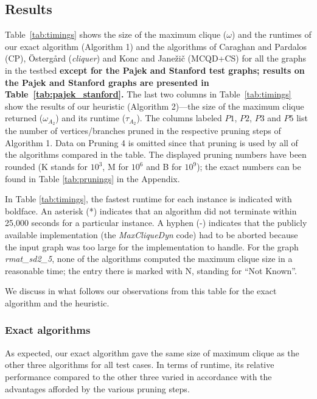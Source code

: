 \subsection{Results}
\label{sec:exp-results}




Table~\ref{tab:timings} shows the size of the maximum clique ($\omega$) and the runtimes  of our exact algorithm (Algorithm 1) and the algorithms of Caraghan and Pardalos (CP), 
\"{O}sterg{\aa}rd ({\it cliquer}) 
and Konc and Jane\v{z}i\v{c}  (MCQD+CS) for all the graphs in the testbed {\bf except  for 
the Pajek and Stanford test graphs;
results on the Pajek and Stanford graphs are presented in Table~\ref{tab:pajek_stanford}. }
The last two columns in Table~\ref{tab:timings} show the results of our 
heuristic (Algorithm 2)---the size of the maximum clique 
returned ($\omega_{A_2}$)  and its runtime ($\tau_{A_2}$). 
The columns labeled $P1$, $P2$, $P3$ and $P5$ list the number of 
vertices/branches pruned in the respective pruning steps of Algorithm 1.
Data on Pruning 4 is omitted since that pruning is used by all of the algorithms compared in the table. The displayed pruning numbers have been rounded  (K stands for $10^3$, M for $10^6$ and B for $10^9$);
the exact numbers can be found in Table \ref{tab:prunings} in the Appendix.

In Table \ref{tab:timings}, the fastest runtime for each instance is indicated with boldface. 
An asterisk (*) indicates that an algorithm did not terminate within 25,000 seconds for a particular
instance. A hyphen (-) indicates that the publicly available implementation 
(the {\it MaxCliqueDyn} code) had to be aborted because the input graph was too large 
for the implementation to handle.
For the graph {\it rmat\_sd2\_5}, none of the algorithms computed the maximum clique size in 
a reasonable time; the entry there is marked with N, standing for  ``Not Known''.

We discuss in what follows our observations from this table
for the exact algorithm and the heuristic.

\subsubsection{Exact algorithms}
\label{sec:exp-exact}

As expected, our exact algorithm gave the same size of maximum clique as the other
three algorithms for all test cases. 
In terms of runtime,  its relative performance compared to the other three varied
in accordance with the advantages afforded by the various pruning steps.  


